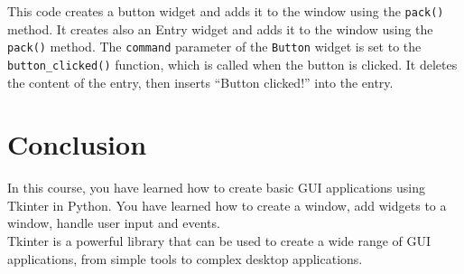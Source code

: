 \documentclass[11pt]{article}
\begin{document}
This code creates a button widget and adds it to the window using the
\texttt{pack()} method. It creates also an Entry widget and adds it to
the window using the \texttt{pack()} method. The \texttt{command}
parameter of the \texttt{Button} widget is set to the
\texttt{button\_clicked()} function, which is called when the button is
clicked. It deletes the content of the entry, then inserts ``Button
clicked!'' into the entry.

\section{Conclusion}\label{conclusion}

In this course, you have learned how to create basic GUI applications
using Tkinter in Python. You have learned how to create a window, add
widgets to a window, handle user input and events.\\
Tkinter is a powerful library that can be used to create a wide range of
GUI applications, from simple tools to complex desktop applications.


    
    
    
\end{document}
